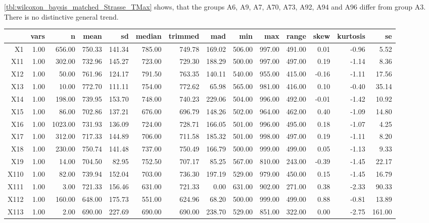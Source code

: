 \cref{tbl:wilcoxon_baysis_matched_Strasse_TMax} shows, that the groups A6, A9, A7, A70, A73, A92, A94 and A96 differ from group A3. There is no distinctive general trend.
\begin{table}[ht!]
	\tiny
	\centering
  \begin{tabular}{rrrrrrrrrrrrrr}
    \hline
   & vars & n & mean & sd & median & trimmed & mad & min & max & range & skew & kurtosis & se \\ 
    \hline
  X1 & 1.00 & 656.00 & 750.33 & 141.34 & 785.00 & 749.78 & 169.02 & 506.00 & 997.00 & 491.00 & 0.01 & -0.96 & 5.52 \\ 
    X11 & 1.00 & 302.00 & 732.96 & 145.27 & 723.00 & 729.30 & 188.29 & 500.00 & 997.00 & 497.00 & 0.19 & -1.14 & 8.36 \\ 
    X12 & 1.00 & 50.00 & 761.96 & 124.17 & 791.50 & 763.35 & 140.11 & 540.00 & 955.00 & 415.00 & -0.16 & -1.11 & 17.56 \\ 
    X13 & 1.00 & 10.00 & 772.70 & 111.11 & 754.00 & 772.62 & 65.98 & 565.00 & 981.00 & 416.00 & 0.10 & -0.40 & 35.14 \\ 
    X14 & 1.00 & 198.00 & 739.95 & 153.70 & 748.00 & 740.23 & 229.06 & 504.00 & 996.00 & 492.00 & -0.01 & -1.42 & 10.92 \\ 
    X15 & 1.00 & 86.00 & 702.86 & 137.21 & 676.00 & 696.79 & 148.26 & 502.00 & 964.00 & 462.00 & 0.40 & -1.09 & 14.80 \\ 
    X16 & 1.00 & 1023.00 & 731.93 & 136.09 & 724.00 & 728.71 & 166.05 & 501.00 & 996.00 & 495.00 & 0.18 & -1.07 & 4.25 \\ 
    X17 & 1.00 & 312.00 & 717.33 & 144.89 & 706.00 & 711.58 & 185.32 & 501.00 & 998.00 & 497.00 & 0.19 & -1.11 & 8.20 \\ 
    X18 & 1.00 & 230.00 & 750.74 & 141.48 & 737.00 & 750.49 & 166.79 & 500.00 & 999.00 & 499.00 & 0.05 & -1.13 & 9.33 \\ 
    X19 & 1.00 & 14.00 & 704.50 & 82.95 & 752.50 & 707.17 & 85.25 & 567.00 & 810.00 & 243.00 & -0.39 & -1.45 & 22.17 \\ 
    X110 & 1.00 & 82.00 & 739.94 & 152.04 & 703.00 & 736.30 & 197.19 & 529.00 & 979.00 & 450.00 & 0.15 & -1.45 & 16.79 \\ 
    X111 & 1.00 & 3.00 & 721.33 & 156.46 & 631.00 & 721.33 & 0.00 & 631.00 & 902.00 & 271.00 & 0.38 & -2.33 & 90.33 \\ 
    X112 & 1.00 & 160.00 & 648.00 & 175.73 & 551.00 & 624.96 & 68.20 & 500.00 & 999.00 & 499.00 & 0.88 & -0.81 & 13.89 \\ 
    X113 & 1.00 & 2.00 & 690.00 & 227.69 & 690.00 & 690.00 & 238.70 & 529.00 & 851.00 & 322.00 & 0.00 & -2.75 & 161.00 \\ 

\end{tabular}
\end{table}

